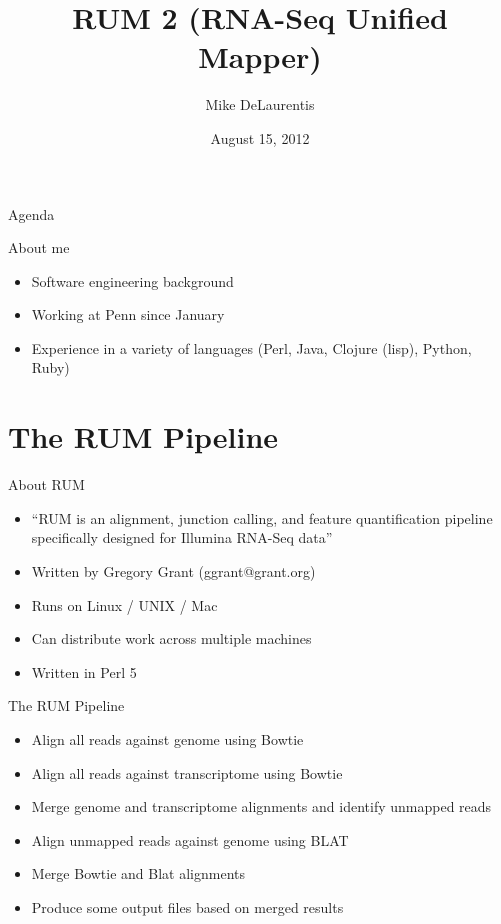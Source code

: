 \documentclass{beamer}
\title[RUM 2]{RUM 2 (RNA-Seq Unified Mapper)}
\author{Mike DeLaurentis}
\institute{University of Pennsylvania}
\date{August 15, 2012}
\begin{document}
\begin{frame}
\titlepage
\end{frame}

\begin{frame}{Agenda}
  \tableofcontents
\end{frame}

\begin{frame}{About me}
  \begin{itemize}
  \item Software engineering background
  \item Working at Penn since January
  \item Experience in a variety of languages (Perl, Java, Clojure (lisp), Python, Ruby)
  \end{itemize}
\end{frame}

\section{The RUM Pipeline}

\begin{frame}{About RUM}
  \begin{itemize}
  \item ``RUM is an alignment, junction calling, and feature quantification pipeline specifically designed for Illumina RNA-Seq data''
  \item Written by Gregory Grant (ggrant@grant.org)
  \item Runs on Linux / UNIX / Mac
  \item Can distribute work across multiple machines
  \item Written in Perl 5
  \end{itemize}
\end{frame}

\begin{frame}{The RUM Pipeline}
\begin{itemize}
  \item Align all reads against genome using Bowtie
  \item Align all reads against transcriptome using Bowtie
  \item Merge genome and transcriptome alignments and identify unmapped reads
  \item Align unmapped reads against genome using BLAT
  \item Merge Bowtie and Blat alignments
  \item Produce some output files based on merged results
\end{itemize}
\end{frame}
\end{document}
